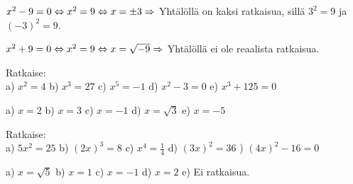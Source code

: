 \begin{esimerkki}
$x^2 - 9 = 0 \Leftrightarrow x^2 = 9 \Leftrightarrow x = \pm 3 \\
\Rightarrow$ Yhtälöllä on kaksi ratkaisua, sillä $3^2 = 9$ ja $(-3)^2 = 9$.
\end{esimerkki}

\begin{esimerkki}
$x^2 + 9 = 0 \Leftrightarrow x^2 = 9 \Leftrightarrow x = \sqrt{-9} \\
\Rightarrow$ Yhtälöllä ei ole reaalista ratkaisua.
\end{esimerkki}

\begin{tehtava}
Ratkaise: \\
a) $ x^2 = 4 $ \qquad
b) $ x^3 = 27 $ \qquad
c) $ x^5 = -1 $ \qquad
d) $ x^2 - 3 = 0 $ \qquad
e) $ x^3 + 125 = 0 $
\begin{vastaus}
a) $ x = 2 $ \qquad
b) $ x = 3 $ \qquad
c) $ x = -1 $ \qquad
d) $ x = \sqrt{3} $ \qquad
e) $ x = -5 $ 
\end{vastaus}
\end{tehtava}

\begin{tehtava}
Ratkaise: \\
a) $ 5x^2 = 25 $ \qquad
b) $ (2x)^3 = 8 $ \qquad
c) $ x^4 = \frac{1}{4} $ \qquad
d) $ (3x)^2 = 36 $ ) $ (4x)^2 - 16 = 0 $ 
\begin{vastaus}
a) $ x = \sqrt{5} $ \qquad
b) $ x = 1 $ \qquad
c) $ x = -1 $ \qquad
d) $ x = 2 $ \qquad
e) Ei ratkaisua. 
\end{vastaus}
\end{tehtava}